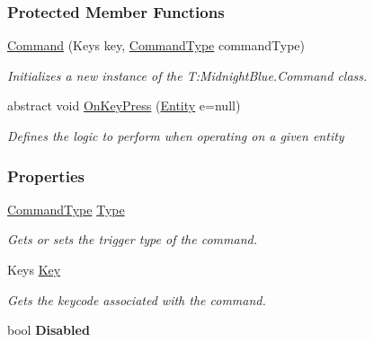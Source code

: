 \subsubsection*{Protected Member Functions}
\begin{DoxyCompactItemize}
\item 
\hyperlink{class_m_b2_d_1_1_i_o_1_1_command_a9cb2200e1b56437406cb300a782a425f}{Command} (Keys key, \hyperlink{namespace_m_b2_d_1_1_i_o_ab5f95f3fe9e652778b62bdf943168a68}{Command\+Type} command\+Type)
\begin{DoxyCompactList}\small\item\em Initializes a new instance of the T\+:\+Midnight\+Blue.\+Command class. \end{DoxyCompactList}\item 
abstract void \hyperlink{class_m_b2_d_1_1_i_o_1_1_command_ae927e36c0e285848325cc68eddb5fd72}{On\+Key\+Press} (\hyperlink{class_m_b2_d_1_1_entity_component_1_1_entity}{Entity} e=null)
\begin{DoxyCompactList}\small\item\em Defines the logic to perform when operating on a given entity \end{DoxyCompactList}\end{DoxyCompactItemize}
\subsubsection*{Properties}
\begin{DoxyCompactItemize}
\item 
\hyperlink{namespace_m_b2_d_1_1_i_o_ab5f95f3fe9e652778b62bdf943168a68}{Command\+Type} \hyperlink{class_m_b2_d_1_1_i_o_1_1_command_afd1e0b56bee6e683db89a55c3b155f9b}{Type}
\begin{DoxyCompactList}\small\item\em Gets or sets the trigger type of the command. \end{DoxyCompactList}\item 
Keys \hyperlink{class_m_b2_d_1_1_i_o_1_1_command_a42f1ab4c0c10b351e296d23713bd0a6a}{Key}
\begin{DoxyCompactList}\small\item\em Gets the keycode associated with the command. \end{DoxyCompactList}\item 
\hypertarget{class_m_b2_d_1_1_i_o_1_1_command_ade6e24126e6d0d094872513b584de862}{}\label{class_m_b2_d_1_1_i_o_1_1_command_ade6e24126e6d0d094872513b584de862} 
bool {\bfseries Disabled}
\end{DoxyCompactItemize}



